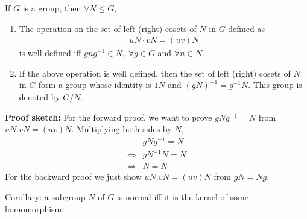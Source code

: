 \documentclass[titlepage, 12pt]{article}
\begin{document}
\begin{proposition}{}{}
    If $G$ is a group, then $\forall N\le G$,
    \begin{enumerate}
        \item The operation on the set of left (right) cosets of $N$ in $G$ defined as
            \begin{gather*}
                uN\cdot vN = (uv)N
            \end{gather*}
            is well defined iff $gng^{-1}\in N,\;\forall g\in G$ and $\forall
            n\in N$.
        \item If the above operation is well defined, then the set of left (right)
            cosets of $N$ in $G$ form a group whose identity is $1N$ and
            $(gN)^{-1} = g^{-1}N$. This group is denoted by $G/N$.
    \end{enumerate}
\end{proposition}
\textbf{Proof sketch:} For the forward proof, we want to prove $gNg^{-1} = N$
from $uN.vN=(uv)N$. Multiplying both sides by $N$,
\begin{align*}
    &gNg^{-1} = N\\
    \iff &gN^{-1}N = N\\
    \iff &N = N
\end{align*}
For the backward proof we just show $uN.vN = (uv)N$ from $gN = Ng$.

Corollary: a subgroup $N$ of $G$ is normal iff it is the kernel of some
homomorphism.
\end{document}
